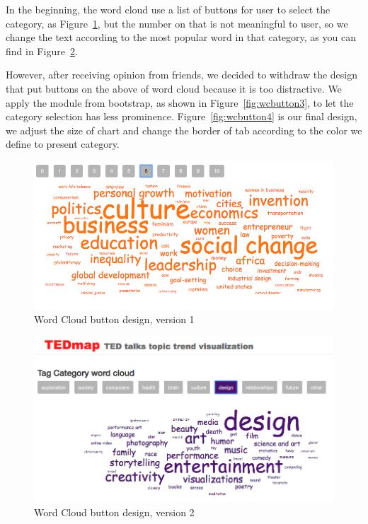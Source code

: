 \documentclass{report}
\numberwithin{figure}{section}
\begin{document}
\quad In the beginning, the word cloud use a list of buttons for user to select the category, as Figure~\ref{fig:wcbutton1}, but the number on that is not meaningful to user, so we change the text according to the most popular word in that category, as you can find in Figure~\ref{fig:wcbutton2}. 

\quad However, after receiving opinion from friends, we decided to withdraw the design that put buttons on the above of word cloud because it is too distractive. We apply the module from bootstrap, as shown in Figure~\ref{fig:wcbutton3}, to let the category selection has less prominence. Figure~\ref{fig:wcbutton4} is our final design, we adjust the size of chart and change the border of tab according to the color we define to present category.   

\begin{figure}
\begin{center}
\includegraphics[scale=0.5]{wcbutton1}
\caption{Word Cloud button design, version 1}
\label{fig:wcbutton1}
\end{center}
\end{figure}

\begin{figure}
\begin{center}
\includegraphics[scale=0.5]{wcbutton2}
\caption{Word Cloud button design, version 2}
\label{fig:wcbutton2}
\end{center}
\end{figure}
\end{document}
